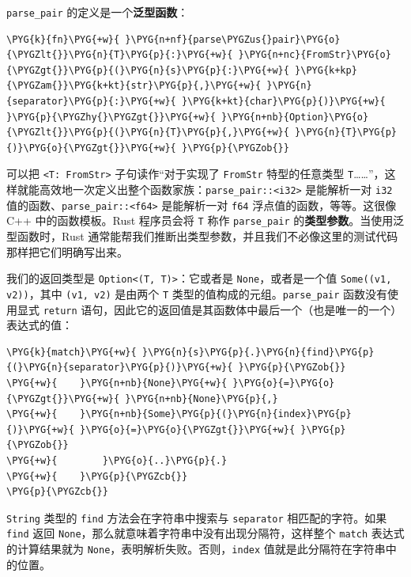 \texttt{parse\_pair} 的定义是一个\textbf{泛型函数}：

\begin{Verbatim}[commandchars=\\\{\},breaklines=true,breakanywhere=true,fontsize=\codefont,xleftmargin=17bp]
\PYG{k}{fn}\PYG{+w}{ }\PYG{n+nf}{parse\PYGZus{}pair}\PYG{o}{\PYGZlt{}}\PYG{n}{T}\PYG{p}{:}\PYG{+w}{ }\PYG{n+nc}{FromStr}\PYG{o}{\PYGZgt{}}\PYG{p}{(}\PYG{n}{s}\PYG{p}{:}\PYG{+w}{ }\PYG{k+kp}{\PYGZam{}}\PYG{k+kt}{str}\PYG{p}{,}\PYG{+w}{ }\PYG{n}{separator}\PYG{p}{:}\PYG{+w}{ }\PYG{k+kt}{char}\PYG{p}{)}\PYG{+w}{ }\PYG{p}{\PYGZhy{}\PYGZgt{}}\PYG{+w}{ }\PYG{n+nb}{Option}\PYG{o}{\PYGZlt{}}\PYG{p}{(}\PYG{n}{T}\PYG{p}{,}\PYG{+w}{ }\PYG{n}{T}\PYG{p}{)}\PYG{o}{\PYGZgt{}}\PYG{+w}{ }\PYG{p}{\PYGZob{}}
\end{Verbatim}

可以把 \texttt{<T: FromStr>} 子句读作“对于实现了 \texttt{FromStr} 特型的任意类型 \texttt{T}……”，这样就能高效地一次定义出整个函数家族：\texttt{parse\_pair::<i32>} 是能解析一对 \texttt{i32} 值的函数、\texttt{parse\_pair::<f64>} 是能解析一对 \texttt{f64} 浮点值的函数，等等。这很像 C++ 中的函数模板。Rust 程序员会将 \texttt{T} 称作 \texttt{parse\_pair} 的\textbf{类型参数}。当使用泛型函数时，Rust 通常能帮我们推断出类型参数，并且我们不必像这里的测试代码那样把它们明确写出来。

我们的返回类型是 \texttt{Option<(T, T)>}：它或者是 \texttt{None}，或者是一个值 \texttt{Some((v1, v2))}，其中 \texttt{(v1, v2)} 是由两个 \texttt{T} 类型的值构成的元组。\texttt{parse\_pair} 函数没有使用显式 \texttt{return} 语句，因此它的返回值是其函数体中最后一个（也是唯一的一个）表达式的值：

\begin{Verbatim}[commandchars=\\\{\},breaklines=true,breakanywhere=true,fontsize=\codefont,xleftmargin=17bp]
\PYG{k}{match}\PYG{+w}{ }\PYG{n}{s}\PYG{p}{.}\PYG{n}{find}\PYG{p}{(}\PYG{n}{separator}\PYG{p}{)}\PYG{+w}{ }\PYG{p}{\PYGZob{}}
\PYG{+w}{    }\PYG{n+nb}{None}\PYG{+w}{ }\PYG{o}{=}\PYG{o}{\PYGZgt{}}\PYG{+w}{ }\PYG{n+nb}{None}\PYG{p}{,}
\PYG{+w}{    }\PYG{n+nb}{Some}\PYG{p}{(}\PYG{n}{index}\PYG{p}{)}\PYG{+w}{ }\PYG{o}{=}\PYG{o}{\PYGZgt{}}\PYG{+w}{ }\PYG{p}{\PYGZob{}}
\PYG{+w}{        }\PYG{o}{..}\PYG{p}{.}
\PYG{+w}{    }\PYG{p}{\PYGZcb{}}
\PYG{p}{\PYGZcb{}}
\end{Verbatim}

\texttt{String} 类型的 \texttt{find} 方法会在字符串中搜索与 \texttt{separator} 相匹配的字符。如果 \texttt{find} 返回 \texttt{None}，那么就意味着字符串中没有出现分隔符，这样整个 \texttt{match} 表达式的计算结果就为 \texttt{None}，表明解析失败。否则，\texttt{index} 值就是此分隔符在字符串中的位置。

